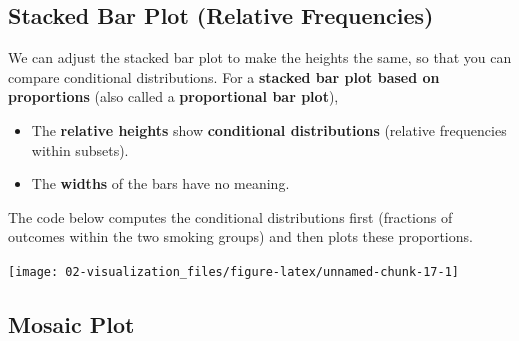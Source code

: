 \documentclass[
]{book}
\newenvironment{Shaded}{\begin{snugshade}}{\end{snugshade}}
\newcommand{\DataTypeTok}[1]{\textcolor[rgb]{0.13,0.29,0.53}{#1}}
\newcommand{\KeywordTok}[1]{\textcolor[rgb]{0.13,0.29,0.53}{\textbf{#1}}}
\newcommand{\NormalTok}[1]{#1}
\newcommand{\OperatorTok}[1]{\textcolor[rgb]{0.81,0.36,0.00}{\textbf{#1}}}
\newcommand{\StringTok}[1]{\textcolor[rgb]{0.31,0.60,0.02}{#1}}
\providecommand{\tightlist}{%
  \setlength{\itemsep}{0pt}\setlength{\parskip}{0pt}}
\begin{document}
\hypertarget{stacked-bar-plot-relative-frequencies}{%
\subsection{Stacked Bar Plot (Relative Frequencies)}\label{stacked-bar-plot-relative-frequencies}}

We can adjust the stacked bar plot to make the heights the same, so that you can compare conditional distributions. For a \textbf{stacked bar plot based on proportions} (also called a \textbf{proportional bar plot}),

\begin{itemize}
\tightlist
\item
  The \textbf{relative heights} show \textbf{conditional distributions} (relative frequencies within subsets).
\item
  The \textbf{widths} of the bars have no meaning.
\end{itemize}

The code below computes the conditional distributions first (fractions of outcomes within the two smoking groups) and then plots these proportions.

\begin{Shaded}
\end{Shaded}

\begin{center}\texttt{[image: 02-visualization\_files/figure-latex/unnamed-chunk-17-1]} \end{center}

\hypertarget{mosaic-plot}{%
\subsection{Mosaic Plot}\label{mosaic-plot}}
\end{document}
